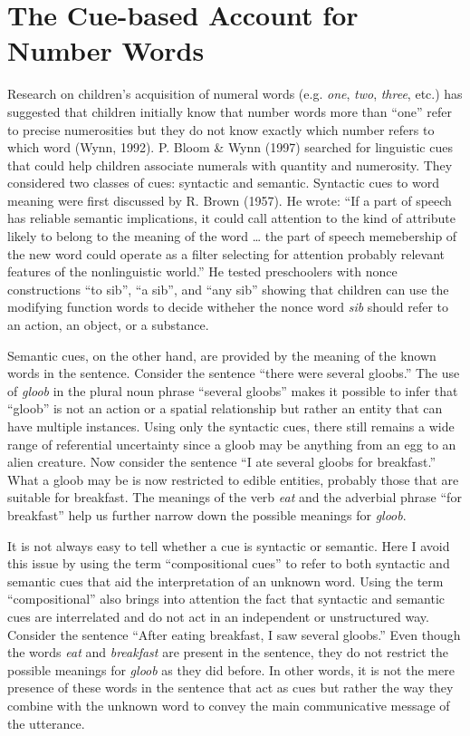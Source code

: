 \documentclass[oneside]{report}
\theoremstyle{definition}
\theoremstyle{definition}
\theoremstyle{definition}
\theoremstyle{remark}
\begin{document}
\section{The Cue-based Account for Number
Words}\label{the-cue-based-account-for-number-words}

Research on children's acquisition of numeral words (e.g. \emph{one},
\emph{two}, \emph{three}, etc.) has suggested that children initially
know that number words more than ``one'' refer to precise numerosities
but they do not know exactly which number refers to which word (Wynn,
1992). P. Bloom \& Wynn (1997) searched for linguistic cues that could
help children associate numerals with quantity and numerosity. They
considered two classes of cues: syntactic and semantic. Syntactic cues
to word meaning were first discussed by R. Brown (1957). He wrote: ``If
a part of speech has reliable semantic implications, it could call
attention to the kind of attribute likely to belong to the meaning of
the word \ldots{} the part of speech memebership of the new word could
operate as a filter selecting for attention probably relevant features
of the nonlinguistic world.'' He tested preschoolers with nonce
constructions ``to sib'', ``a sib'', and ``any sib'' showing that
children can use the modifying function words to decide witheher the
nonce word \emph{sib} should refer to an action, an object, or a
substance.

Semantic cues, on the other hand, are provided by the meaning of the
known words in the sentence. Consider the sentence ``there were several
gloobs.'' The use of \emph{gloob} in the plural noun phrase ``several
gloobs'' makes it possible to infer that ``gloob'' is not an action or a
spatial relationship but rather an entity that can have multiple
instances. Using only the syntactic cues, there still remains a wide
range of referential uncertainty since a gloob may be anything from an
egg to an alien creature. Now consider the sentence ``I ate several
gloobs for breakfast.'' What a gloob may be is now restricted to edible
entities, probably those that are suitable for breakfast. The meanings
of the verb \emph{eat} and the adverbial phrase ``for breakfast'' help
us further narrow down the possible meanings for \emph{gloob}.

It is not always easy to tell whether a cue is syntactic or semantic.
Here I avoid this issue by using the term ``compositional cues'' to
refer to both syntactic and semantic cues that aid the interpretation of
an unknown word. Using the term ``compositional'' also brings into
attention the fact that syntactic and semantic cues are interrelated and
do not act in an independent or unstructured way. Consider the sentence
``After eating breakfast, I saw several gloobs.'' Even though the words
\emph{eat} and \emph{breakfast} are present in the sentence, they do not
restrict the possible meanings for \emph{gloob} as they did before. In
other words, it is not the mere presence of these words in the sentence
that act as cues but rather the way they combine with the unknown word
to convey the main communicative message of the utterance.
\end{document}

